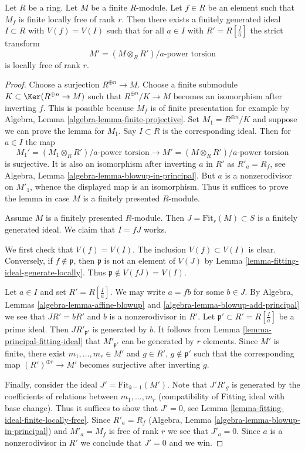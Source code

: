 \begin{lemma}
\label{lemma-blowup-module}
Let $R$ be a ring. Let $M$ be a finite $R$-module. Let $f \in R$
be an element such that $M_f$ is finite locally free of rank $r$.
Then there exists a finitely generated ideal $I \subset R$ with
$V(f) = V(I)$ such that for all $a \in I$ with $R' = R[\frac{I}{a}]$
the strict transform
$$
M' = (M \otimes_R R')/a\text{-power torsion}
$$
is locally free of rank $r$.
\end{lemma}

\begin{proof}
Choose a surjection $R^{\oplus n} \to M$. Choose a finite submodule
$K \subset \Ker(R^{\oplus n} \to M)$ such that $R^{\oplus n}/K \to M$
becomes an isomorphism after inverting $f$. This is possible because
$M_f$ is of finite presentation for example by
Algebra, Lemma \ref{algebra-lemma-finite-projective}.
Set $M_1 = R^{\oplus n}/K$
and suppose we can prove the lemma for $M_1$. Say $I \subset R$ is the
corresponding ideal. Then for $a \in I$ the map
$$
M_1' = (M_1 \otimes_R R')/a\text{-power torsion}
\longrightarrow
M' = (M \otimes_R R')/a\text{-power torsion}
$$
is surjective. It is also an isomorphism after inverting $a$ in $R'$
as $R'_a = R_f$, see Algebra, Lemma \ref{algebra-lemma-blowup-in-principal}.
But $a$ is a nonzerodivisor on $M'_1$, whence the displayed map is an
isomorphism. Thus it suffices to prove the lemma in case $M$ is a finitely
presented $R$-module.

\medskip\noindent
Assume $M$ is a finitely presented $R$-module.
Then $J = \text{Fit}_r(M) \subset S$ is a finitely generated ideal.
We claim that $I = fJ$ works.

\medskip\noindent
We first check that $V(f) = V(I)$. The inclusion $V(f) \subset V(I)$ is
clear. Conversely, if $f \not \in \mathfrak p$, then
$\mathfrak p$ is not an element of $V(J)$ by 
Lemma \ref{lemma-fitting-ideal-generate-locally}.
Thus $\mathfrak p \not \in V(fJ) = V(I)$.

\medskip\noindent
Let $a \in I$ and set $R' = R[\frac{I}{a}]$. We may write $a = fb$
for some $b \in J$. By Algebra, Lemmas \ref{algebra-lemma-affine-blowup} and
\ref{algebra-lemma-blowup-add-principal} we see that $J R' = b R'$
and $b$ is a nonzerodivisor in $R'$. 
Let $\mathfrak p' \subset R' = R[\frac{I}{a}]$ be
a prime ideal. Then $JR'_{\mathfrak p'}$ is generated by $b$.
It follows from
Lemma \ref{lemma-principal-fitting-ideal}
that $M'_{\mathfrak p'}$ can be generated by $r$ elements.
Since $M'$ is finite, there exist $m_1, \ldots, m_r \in M'$ and
$g \in R'$, $g \not \in \mathfrak p'$ such that the corresponding map
$(R')^{\oplus r} \to M'$ becomes surjective after inverting $g$.

\medskip\noindent
Finally, consider the ideal $J' = \text{Fit}_{k - 1}(M')$.
Note that $J' R'_g$ is generated by the coefficients of relations between
$m_1, \ldots, m_r$ (compatibility of Fitting ideal with base change).
Thus it suffices to show that $J' = 0$, see
Lemma \ref{lemma-fitting-ideal-finite-locally-free}.
Since $R'_a = R_f$ (Algebra, Lemma \ref{algebra-lemma-blowup-in-principal})
and $M'_a = M_f$ is free of rank $r$ we see that $J'_a = 0$.
Since $a$ is a nonzerodivisor in $R'$ we
conclude that $J' = 0$ and we win.
\end{proof}